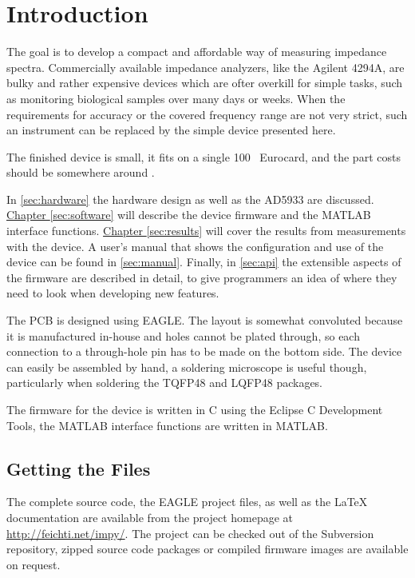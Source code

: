 \chapter{Introduction}

The goal is to develop a compact and affordable way of measuring impedance spectra. Commercially available impedance
analyzers, like the Agilent 4294A, are bulky and rather expensive devices which are ofter overkill for simple
tasks, such as monitoring biological samples over many days or weeks. When the requirements for accuracy or the covered
frequency range are not very strict, such an instrument can be replaced by the simple device presented here.

The finished device is small, it fits on a single \unit{100 }{\milli\meter} Eurocard, and the part costs
should be somewhere around .

In \autoref{sec:hardware} the hardware design as well as the AD5933 are discussed.
\hyperref[sec:software]{Chapter \ref*{sec:software}} will describe the device firmware and the MATLAB interface
functions.
\hyperref[sec:results]{Chapter \ref*{sec:results}} will cover the results from measurements with the device.
A user's manual that shows the configuration and use of the device can be found in \autoref{sec:manual}.
Finally, in \autoref{sec:api} the extensible aspects of the firmware are described in detail, to give programmers an
idea of where they need to look when developing new features.

The PCB is designed using EAGLE\footnotemark{}. The layout is somewhat convoluted because it is manufactured in-house
and holes cannot be plated through, so each connection to a through-hole pin has to be made on the bottom side.
The device can easily be assembled by hand, a soldering microscope is useful though, particularly when soldering the
TQFP48 and LQFP48 packages.


The firmware for the device is written in C using the Eclipse C Development Tools\footnotemark{}, the MATLAB interface
functions are written in MATLAB.



\section{Getting the Files}

The complete source code, the EAGLE project files, as well as the \LaTeX{} documentation are available from the project
homepage at \url{http://feichti.net/impy/}. The project can be checked out of the Subversion repository, zipped source
code packages or compiled firmware images are available on request.

